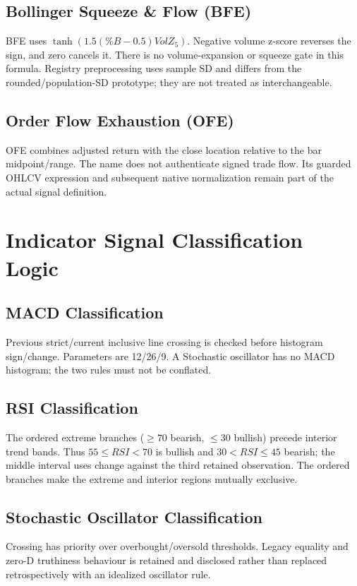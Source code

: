 \subsection{Bollinger Squeeze \& Flow (BFE)}
BFE uses $\tanh(1.5(\%B-0.5)VolZ_5)$. Negative volume z-score reverses the sign, and zero cancels it. There is no volume-expansion or squeeze gate in this formula. Registry preprocessing uses sample SD and differs from the rounded/population-SD prototype; they are not treated as interchangeable.

\subsection{Order Flow Exhaustion (OFE)}
OFE combines adjusted return with the close location relative to the bar midpoint/range. The name does not authenticate signed trade flow. Its guarded OHLCV expression and subsequent native normalization remain part of the actual signal definition.

\FloatBarrier
\setcounter{table}{0}
\section{Indicator Signal Classification Logic}
\label{app:indicator_logic}

\subsection{MACD Classification}
Previous strict/current inclusive line crossing is checked before histogram sign/change. Parameters are 12/26/9. A Stochastic oscillator has no MACD histogram; the two rules must not be conflated.
\subsection{RSI Classification}
The ordered extreme branches ($\ge70$ bearish, $\le30$ bullish) precede interior trend bands. Thus $55\le RSI<70$ is bullish and $30<RSI\le45$ bearish; the middle interval uses change against the third retained observation. The ordered branches make the extreme and interior regions mutually exclusive.
\subsection{Stochastic Oscillator Classification}
Crossing has priority over overbought/oversold thresholds. Legacy equality and zero-D truthiness behaviour is retained and disclosed rather than replaced retrospectively with an idealized oscillator rule.
